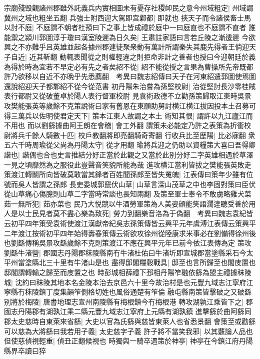 宗廟殘毁觀諸州郡雖外託義兵内實相圖未有憂存社稷卹民之意今州域粗定|{
	州域謂冀州之域也粗坐五翻}
兵強士附西迎大駕即宫鄴都|{
	即就也}
挾天子而令諸侯畜士馬以討不庭|{
	不庭謂不朝者杜預曰下之事上皆成禮於庭中一曰庭直也不庭謂不直者}
誰能禦之潁川郭圖淳于瓊曰漢室陵遲為日久矣|{
	王肅註家語曰言若丘陵之漸逶遲}
今欲興之不亦難乎且英雄並起各據州郡連徒聚衆動有萬計所謂秦失其鹿先得者王倘迎天子自近|{
	近其靳翻}
動輒表聞從之則權輕違之則拒命非計之善者也授曰今迎朝廷於義為得於時為宜若不早定必有先之者矣紹不從|{
	紹不能從授之言果為曹操所先帝既都許乃欲移以自近不亦晩乎先悉薦翻　考異曰魏志紹傳曰天子在河東紹遣郭圖使焉圖還說紹迎天子都鄴紹不從今從范書}
初丹陽朱治嘗為孫堅校尉|{
	治從堅討長沙零桂賊表行都尉又從破董卓於陽人表行督軍校尉}
見袁術政德不立勸孫策歸取江東時吳景攻樊能張英等歲餘不克策說術曰家有舊恩在東願助舅討横江横江拔因投本土召募可得三萬兵以佐明使君定天下|{
	策本江東人故謂之本土}
術知其恨|{
	謂許以九江廬江而不用也}
而以劉繇據曲阿王朗在會稽|{
	會工外翻}
謂策未必能定乃許之表策為折衝校尉將兵千餘人騎數十匹|{
	校戶教翻將即亮翻騎奇寄翻}
行收兵比至歷陽|{
	比必寐翻}
衆五六千時周瑜從父尚為丹陽太守|{
	從才用翻}
瑜將兵迎之仍助以資糧策大喜曰吾得卿諧也|{
	諧偶也合也史言推結分好正當於此觀之又當於此别分好二字英雄相遇於草澤一見之頃靡然為之服役此豈聲音笑貌所能為哉}
進攻横江當利皆拔之樊能張英敗走策渡江轉鬭所向皆破莫敢當其鋒者百姓聞孫郎至皆失䰟魄|{
	江表傳曰策年少雖有位　號而吳人皆謂之孫郎}
長吏委城郭竄伏山草|{
	山草言深山茂草之中也李固對策曰臣伏從山草痛心傷臆則山草二字當時常談也長知兩翻}
及策至軍士奉令不敢虜略雞犬菜茹一無所犯|{
	茹亦菜也}
民乃大悦競以牛酒勞軍策為人美姿顔能笑語濶逹聽受善於用人是以士民見者莫不盡心樂為致死|{
	勞力到翻樂音洛為于偽翻　考異曰魏志袁紀皆云初平四年策受袁術使渡江漢獻帝紀吳志孫策傳皆云興平元年虞溥江表傳云策興平二年渡江按術初平四年始得壽春策傳云術欲攻徐州從陸康求米事必在劉備得徐州後也劉繇傳稱吳景攻繇歲餘不克則策渡江不應在興平元年已前今依江表傳為定}
策攻劉繇牛渚營|{
	郡國志丹陽郡秣陵縣南冇牛渚杜佑曰牛渚圻即宣城郡當塗縣采石今太平州當塗縣北三十里有牛渚山是也}
盡得邸閣糧穀戰具|{
	邸至也言所歸至也閣庋置也邸閣謂轉輸之歸至而庋置之也}
時彭城相薛禮下邳相丹陽笮融依繇為盟主禮據秣陵城|{
	沈約曰秣陵其地本名金陵本治去京邑六十里今故治村是也元豐九域志江寧府江寧縣冇秣陵鎮丁度集韻笮側格切姓也風俗通楚有笮倫}
融屯縣南策皆擊破之又破繇别將於梅陵|{
	唐書地理志宣州南陵縣有梅根鎮今冇梅根港}
轉攻湖孰江乘皆下之|{
	郡國志丹陽郡有湖孰江乘二縣元豐九域志江寧府上元縣有湖孰鎮}
進擊繇於曲阿繇同郡太史慈時自東萊來省繇|{
	大史以官為氏繇與慈皆東萊人也省悉景翻}
會策至或勸繇可以慈為大將繇曰我若用子義|{
	太史慈字子義}
許子將不當笑我邪|{
	以其覈論人品也}
但使慈偵視輕重|{
	偵丑正翻候視也}
時獨與一騎卒遇策於神亭|{
	神亭在今鎮江府丹陽縣界卒讀曰猝}
